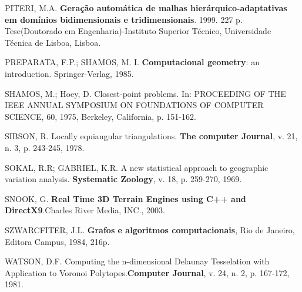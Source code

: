 \documentclass[12pt,a4paper]{book}
\begin{document}
\begin{thebibliography}{99}
 PITERI, M.A. {\bf Gera\c{c}\~{a}o autom\'{a}tica de malhas hier\'{a}rquico-adaptativas em dom\'{i}nios bidimensionais e tridimensionais}. 1999. 227 p. Tese(Doutorado em Engenharia)-Instituto Superior T\'ecnico, Universidade T\'ecnica de Lisboa, Lisboa.

 PREPARATA, F.P.; SHAMOS, M. I. {\bf Computacional geometry}: an
introduction. Springer-Verlag, 1985.

 SHAMOS, M.; Hoey, D. Closest-point problems. In: PROCEEDING OF THE IEEE ANNUAL SYMPOSIUM ON FOUNDATIONS OF COMPUTER SCIENCE, 60, 1975, Berkeley, California, p. 151-162.

  SIBSON, R. Locally equiangular triangulations. {\bf The computer Journal}, v. 21, n. 3, p. 243-245, 1978.

 SOKAL, R.R; GABRIEL, K.R. A new statistical approach to geographic variation analysis. {\bf Systematic Zoology}, v. 18, p. 259-270, 1969.

 SNOOK, G. {\bf 	Real Time 3D Terrain Engines using C++ and DirectX9}.Charles River Media, INC., 2003.

 SZWARCFITER, J.L. {\bf Grafos e algoritmos computacionais}, Rio de Janeiro, Editora Campus, 1984, 216p.

 WATSON, D.F. Computing the n-dimensional Delaunay Tesselation with Application to Voronoi Polytopes.{\bf Computer Journal}, v. 24, n. 2, p. 167-172, 1981.

\end{thebibliography}
\end{document}
